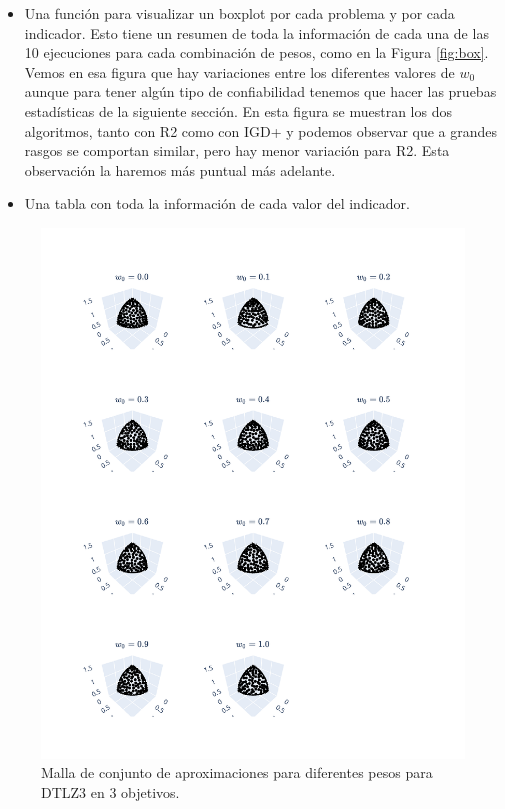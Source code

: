 \begin{itemize}
    \item Una función para visualizar un boxplot por cada problema y por cada indicador. Esto tiene un resumen de toda la información de cada una de las 10 ejecuciones para cada combinación de pesos, como en la Figura \ref{fig:box}.  Vemos en esa figura que hay variaciones entre los diferentes valores de $w_0$ aunque para tener algún tipo de confiabilidad tenemos que hacer las pruebas estadísticas de la siguiente sección. En esta figura se muestran los dos algoritmos, tanto con R2 como con IGD+ y podemos observar que a grandes rasgos se comportan similar, pero hay menor variación para R2. Esta observación la haremos más puntual más adelante.
    \item Una tabla con toda la información de cada valor del indicador.
\end{itemize}


\begin{figure} [H]
    \centering
    \includegraphics[width=\textwidth]{Figuras/DTLZ3_obj_3_alg_IGD+_indmed_HV_malla.pdf}
    \caption[Aproximación 3D al PF]{Malla de conjunto de aproximaciones para diferentes pesos para DTLZ3 en 3 objetivos.}
    \label{fig:aproximacion}
\end{figure}

